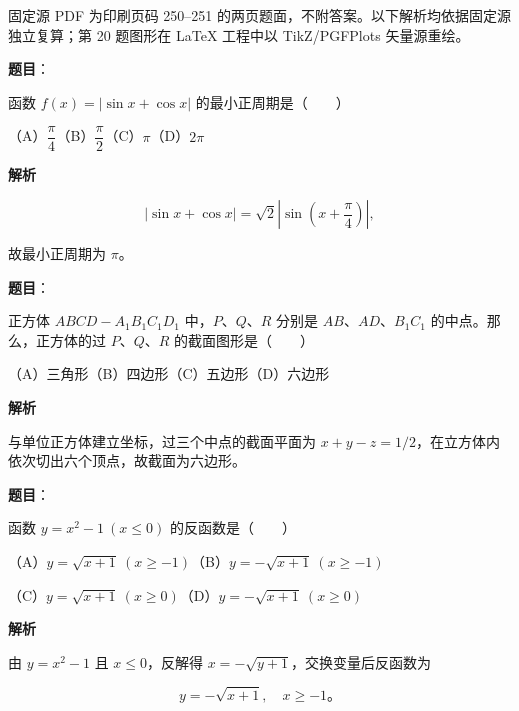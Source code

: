 

\begin{gktip}
固定源 PDF 为印刷页码 250–251 的两页题面，不附答案。以下解析均依据固定源独立复算；第 20 题图形在 LaTeX 工程中以 TikZ/PGFPlots 矢量源重绘。
\end{gktip}

\begin{answer}

\textbf{题目}：

函数 $f(x)=|\sin x+\cos x|$ 的最小正周期是\mbox{（　　）}

（A）$\dfrac{\pi}{4}$\quad（B）$\dfrac{\pi}{2}$\quad（C）$\pi$\quad（D）$2\pi$

\textbf{解析}

\nopagebreak[4]
\[
|\sin x+\cos x|=\sqrt2\left|\sin\left(x+\frac\pi4\right)\right|,
\]

故最小正周期为 $\pi$。


\end{answer}
\begin{answer}

\textbf{题目}：

正方体 $ABCD-A_1B_1C_1D_1$ 中，$P\text{、}Q\text{、}R$ 分别是 $AB\text{、}AD\text{、}B_1C_1$ 的中点。那么，正方体的过 $P\text{、}Q\text{、}R$ 的截面图形是\mbox{（　　）}

（A）三角形\quad（B）四边形\quad（C）五边形\quad（D）六边形

\textbf{解析}

与单位正方体建立坐标，过三个中点的截面平面为 $x+y-z=1/2$，在立方体内依次切出六个顶点，故截面为六边形。


\end{answer}
\begin{answer}

\textbf{题目}：

函数 $y=x^2-1\ (x\leqslant0)$ 的反函数是\mbox{（　　）}

（A）$y=\sqrt{x+1}\ (x\geqslant-1)$\quad（B）$y=-\sqrt{x+1}\ (x\geqslant-1)$

（C）$y=\sqrt{x+1}\ (x\geqslant0)$\quad（D）$y=-\sqrt{x+1}\ (x\geqslant0)$

\textbf{解析}

由 $y=x^2-1$ 且 $x\leqslant0$，反解得 $x=-\sqrt{y+1}$，交换变量后反函数为

\nopagebreak[4]
\[
y=-\sqrt{x+1},\quad x\geqslant-1\text{。}
\]


\end{answer}
